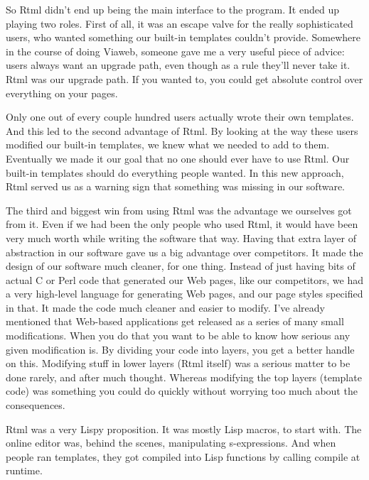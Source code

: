 So Rtml didn't end up being the main interface to the program. It ended
up playing two roles. First of all, it was an escape valve for the
really sophisticated users, who wanted something our built-in templates
couldn't provide. Somewhere in the course of doing Viaweb, someone gave
me a very useful piece of advice: users always want an upgrade path,
even though as a rule they'll never take it. Rtml was our upgrade path.
If you wanted to, you could get absolute control over everything on your
pages.

Only one out of every couple hundred users actually wrote their own
templates. And this led to the second advantage of Rtml. By looking at
the way these users modified our built-in templates, we knew what we
needed to add to them. Eventually we made it our goal that no one should
ever have to use Rtml. Our built-in templates should do everything
people wanted. In this new approach, Rtml served us as a warning sign
that something was missing in our software.

The third and biggest win from using Rtml was the advantage we ourselves
got from it. Even if we had been the only people who used Rtml, it would
have been very much worth while writing the software that way. Having
that extra layer of abstraction in our software gave us a big advantage
over competitors. It made the design of our software much cleaner, for
one thing. Instead of just having bits of actual C or Perl code that
generated our Web pages, like our competitors, we had a very high-level
language for generating Web pages, and our page styles specified in
that. It made the code much cleaner and easier to modify. I've already
mentioned that Web-based applications get released as a series of many
small modifications. When you do that you want to be able to know how
serious any given modification is. By dividing your code into layers,
you get a better handle on this. Modifying stuff in lower layers (Rtml
itself) was a serious matter to be done rarely, and after much thought.
Whereas modifying the top layers (template code) was something you could
do quickly without worrying too much about the consequences.

Rtml was a very Lispy proposition. It was mostly Lisp macros, to start
with. The online editor was, behind the scenes, manipulating
s-expressions. And when people ran templates, they got compiled into
Lisp functions by calling compile at runtime.

